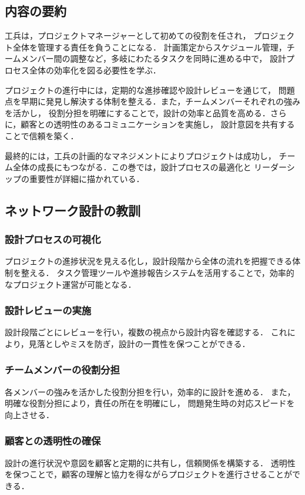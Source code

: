 \documentclass[titlepage,a4paper]{jsarticle}
\begin{document}
\subsection{内容の要約}
工兵は，プロジェクトマネージャーとして初めての役割を任され，
プロジェクト全体を管理する責任を負うことになる．
計画策定からスケジュール管理，チームメンバー間の調整など，多岐にわたるタスクを同時に進める中で，
設計プロセス全体の効率化を図る必要性を学ぶ．

プロジェクトの進行中には，定期的な進捗確認や設計レビューを通じて，
問題点を早期に発見し解決する体制を整える．また，チームメンバーそれぞれの強みを活かし，
役割分担を明確にすることで，設計の効率と品質を高める．さらに，顧客との透明性のあるコミュニケーションを実施し，
設計意図を共有することで信頼を築く．

最終的には，工兵の計画的なマネジメントによりプロジェクトは成功し，
チーム全体の成長にもつながる．この巻では，設計プロセスの最適化と
リーダーシップの重要性が詳細に描かれている．

\subsection{ネットワーク設計の教訓}
\subsubsection{設計プロセスの可視化}
プロジェクトの進捗状況を見える化し，設計段階から全体の流れを把握できる体制を整える．
タスク管理ツールや進捗報告システムを活用することで，効率的なプロジェクト運営が可能となる．

\subsubsection{設計レビューの実施}
設計段階ごとにレビューを行い，複数の視点から設計内容を確認する．
これにより，見落としやミスを防ぎ，設計の一貫性を保つことができる．

\subsubsection{チームメンバーの役割分担}
各メンバーの強みを活かした役割分担を行い，効率的に設計を進める．
また，明確な役割分担により，責任の所在を明確にし，
問題発生時の対応スピードを向上させる．

\subsubsection{顧客との透明性の確保}
設計の進行状況や意図を顧客と定期的に共有し，信頼関係を構築する．
透明性を保つことで，顧客の理解と協力を得ながらプロジェクトを進行させることができる．
\end{document}
